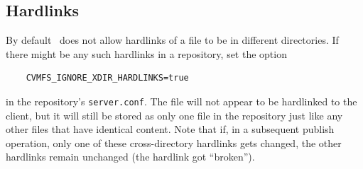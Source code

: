 \subsection{Hardlinks}
By default \cvmfs\ does not allow hardlinks of a file to be in different directories.
If there might be any such hardlinks in a repository, set the option
\begin{verbatim}
    CVMFS_IGNORE_XDIR_HARDLINKS=true
\end{verbatim}
in the repository's \texttt{server.conf}.
The file will not appear to be hardlinked to the client, but it will still be stored as only one file in the repository just like any other files that have identical content.
Note that if, in a subsequent publish operation, only one of these cross-directory hardlinks gets changed, the other hardlinks remain unchanged (the hardlink got ``broken'').
